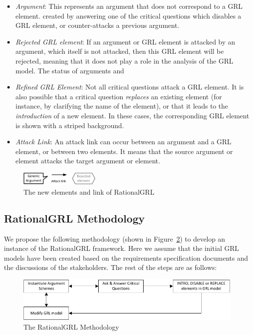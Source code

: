 \begin{itemize}
\item \emph{Argument}: This represents an argument that does not correspond to a GRL element. created by answering one of the critical questions which disables a GRL element, or counter-attacks a previous argument. 
\item \emph{Rejected GRL element}: If an argument or GRL element is attacked by an argument, which itself is not attacked, then this GRL element will be rejected, meaning that it does not play a role in the analysis of the GRL model. The status of arguments and 
\item \emph{Refined GRL Element}: Not all critical questions attack a GRL element. It is also possible that a critical question \emph{replaces} an existing element (for instance, by clarifying the name of the element), or that it leads to the \emph{introduction} of a new element. In these cases, the corresponding GRL element is shown with a striped background. 
\item \emph{Attack Link}: An attack link can occur between an argument and a GRL element, or between two elements. It means that the source argument or element attacks the target argument or element.
\end{itemize} 

\begin{figure}[h]
\centering
\includegraphics[width=0.35\textwidth]{img/legend}
\caption{The new elements and link of RationalGRL}
\label{fig:rationalgrllegend}
\end{figure}
\fi%

\subsection{RationalGRL Methodology} 

We propose the following methodology (shown in Figure~\ref{fig:rationalgrl-methodology}) to develop an instance of the RationalGRL framework. Here we assume that the initial GRL models have been created based on the requirements specification documents and the discussions of the stakeholders. The rest of the steps are as follows:

\begin{figure}[ht]
\centering
\includegraphics{img/methodology.pdf}
\caption{The RationalGRL Methodology}
\label{fig:rationalgrl-methodology}
\end{figure}

